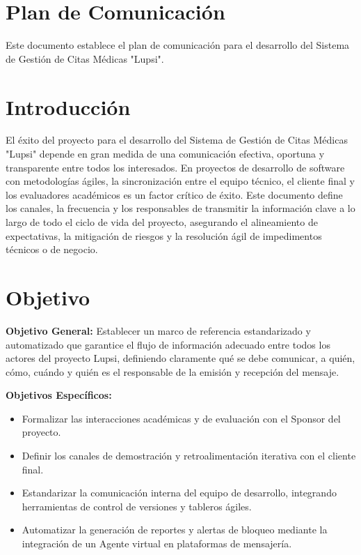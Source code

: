 \documentclass[a4paper,12pt]{article}
\begin{document}
\raggedbottom

\section{Plan de Comunicación}
Este documento establece el plan de comunicación para el desarrollo del Sistema de Gestión de Citas Médicas "Lupsi".

\section{Introducción}
El éxito del proyecto para el desarrollo del Sistema de Gestión de Citas Médicas "Lupsi" depende en gran medida de una comunicación efectiva, oportuna y transparente entre todos los interesados. En proyectos de desarrollo de software con metodologías ágiles, la sincronización entre el equipo técnico, el cliente final y los evaluadores académicos es un factor crítico de éxito. Este documento define los canales, la frecuencia y los responsables de transmitir la información clave a lo largo de todo el ciclo de vida del proyecto, asegurando el alineamiento de expectativas, la mitigación de riesgos y la resolución ágil de impedimentos técnicos o de negocio.

\section{Objetivo}
\textbf{Objetivo General:} Establecer un marco de referencia estandarizado y automatizado que garantice el flujo de información adecuado entre todos los actores del proyecto Lupsi, definiendo claramente qué se debe comunicar, a quién, cómo, cuándo y quién es el responsable de la emisión y recepción del mensaje.

\textbf{Objetivos Específicos:}
\begin{itemize}
    \item Formalizar las interacciones académicas y de evaluación con el Sponsor del proyecto.
    \item Definir los canales de demostración y retroalimentación iterativa con el cliente final.
    \item Estandarizar la comunicación interna del equipo de desarrollo, integrando herramientas de control de versiones y tableros ágiles.
    \item Automatizar la generación de reportes y alertas de bloqueo mediante la integración de un Agente virtual en plataformas de mensajería.
\end{itemize}
\end{document}
